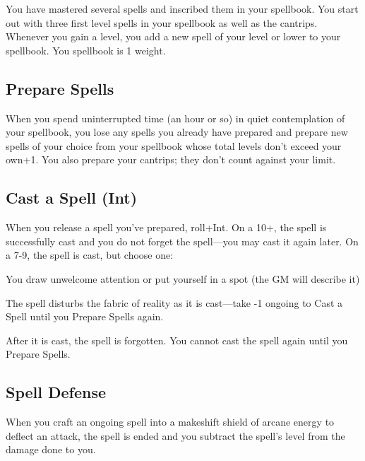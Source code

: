 You have mastered several spells and inscribed them in your spellbook. You start out with three first level spells in your spellbook as well as the cantrips. Whenever you gain a level, you add a new spell of your level or lower to your spellbook. You spellbook is 1 weight.

 
\subsection{Prepare Spells}    
 

When you spend uninterrupted time (an hour or so) in quiet contemplation of your spellbook, you lose any spells you already have prepared and prepare new spells of your choice from your spellbook whose total levels don't exceed your own+1. You also prepare your cantrips; they don't count against your limit.

 
\subsection{Cast a Spell (Int)}     
 

When you release a spell you've prepared, roll+Int. On a 10+, the spell is successfully cast and you do not forget the spell—you may cast it again later. On a 7-9, the spell is cast, but choose one:

 
\startitemize[1,packed]

\item You draw unwelcome attention or put yourself in a spot (the GM will describe it)

 
\item The spell disturbs the fabric of reality as it is cast—take -1 ongoing to Cast a Spell until you Prepare Spells again.

 
\item After it is cast, the spell is forgotten. You cannot cast the spell again until you Prepare Spells.


\stopitemize
 
\subsection{Spell Defense}    
 

When you craft an ongoing spell into a makeshift shield of arcane energy to deflect an attack, the spell is ended and you subtract the spell's level from the damage done to you.

